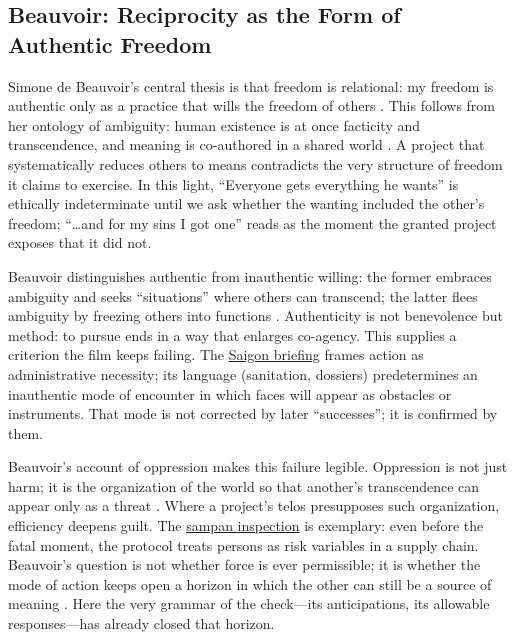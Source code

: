 \subsection*{Beauvoir: Reciprocity as the Form of Authentic Freedom}
\label{ssec:iii-beauvoir}
Simone de Beauvoir's central thesis is that freedom is relational: my freedom is authentic only as a
practice that wills the freedom of others \parencite[p.~73]{Beauvoir1976}. This follows from
her ontology of ambiguity: human existence is at once facticity and transcendence, and meaning
is co-authored in a shared world \parencite[pp.~9--14, 24--30]{Beauvoir1976}. A project that
systematically reduces others to means contradicts the very structure of freedom it claims to
exercise. In this light, ``Everyone gets everything he wants'' is ethically indeterminate until
we ask whether the wanting included the other's freedom; ``\ldots and for my sins I got one''
reads as the moment the granted project exposes that it did not.

Beauvoir distinguishes authentic from inauthentic willing: the former embraces ambiguity and
seeks ``situations'' where others can transcend; the latter flees ambiguity by freezing others
into functions \parencite[pp.~70--76, 134--145]{Beauvoir1976}. Authenticity is not benevolence
but method: to pursue ends in a way that enlarges co-agency. This supplies a criterion the film
keeps failing. The \hyperref[scene:briefing]{Saigon briefing} frames action as administrative
necessity; its language (sanitation, dossiers) predetermines an inauthentic mode of encounter in
which faces will appear as obstacles or instruments. That mode is not corrected by later
``successes''; it is confirmed by them.

Beauvoir's account of oppression makes this failure legible. Oppression is not just harm; it is
the organization of the world so that another's transcendence can appear only as a threat
\parencite[pp.~85--91, 157--161]{Beauvoir1976}. Where a project's telos presupposes such
organization, efficiency deepens guilt. The \hyperref[scene:sampan]{sampan inspection} is
exemplary: even before the fatal moment, the protocol treats persons as risk variables in a
supply chain. Beauvoir's
question is not whether force is ever permissible; it is whether the mode of action keeps open
a horizon in which the other can still be a source of meaning
\parencite[pp.~139--147, 164--173]{Beauvoir1976}. Here the very grammar of the check—its
anticipations, its allowable responses—has already closed that horizon.

